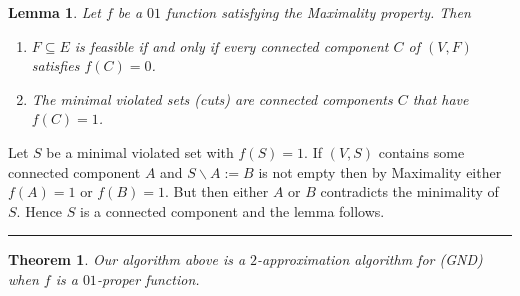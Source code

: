 \documentclass[letterpaper,12pt,oneside,onecolumn]{article}
\newenvironment{proof}{{\bf Proof:  }}{\hfill\rule{2mm}{2mm}}
\newtheorem{lemma}[fact]{Lemma}
\newtheorem{theorem}[fact]{Theorem}
\begin{document}
\begin{lemma}
Let $f$ be a $01$ function satisfying the Maximality property. Then
\begin{enumerate}
\item $F \subseteq E$ is feasible if and only if every connected component $C$ of $(V,F)$ satisfies $f(C) = 0$.
\item The minimal violated sets (cuts) are connected components $C$ that have $f(C) = 1$.
\end{enumerate}
\end{lemma}
\begin{proof}
Let $S$ be a minimal violated set with $f(S) = 1$. If $(V,S)$ contains some connected component $A$ and $S\backslash A := B$ is not empty then by Maximality either $f(A) = 1$ or $f(B) = 1$. But then either $A$ or $B$ contradicts the minimality of $S$. Hence $S$ is a connected component and the lemma follows.
\end{proof}
\begin{theorem}
Our algorithm above is a $2$-approximation algorithm for (GND) when $f$ is a $01$-proper function.
\end{theorem}
\end{document}
